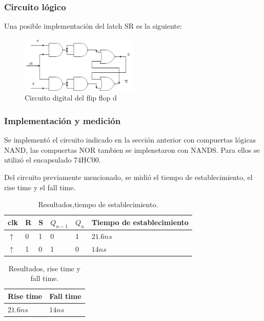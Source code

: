 \documentclass[../../e3_tp2_main.tex]{subfiles}
\begin{document}
\subsubsection{Circuito lógico}
Una posible implementación del latch SR es la siguiente:
\begin{figure}[H]	
	\centering
	\includegraphics[width=0.5\textwidth]{imagenes/lsr_cd.png}
	\caption{Circuito digital del flip flop d}
\end{figure}

\subsubsection{Implementación y medici\'on}
Se implementó el circuito indicado en la sección anterior con compuertas lógicas NAND, las compuertas NOR tambien se implenetaron con NANDS. Para ellos se utilizó el encapsulado 74HC00. \par

Del circuito previamente mencionado, se midió el tiempo de establecimiento, el rise time y el fall time. 

\begin{table}[h]
\begin{center}
\begin{tabular}{|l|l|l|l|l|l|}
\hline
clk& R&S & $Q_{n-1}$ & $Q_n$ &Tiempo de establecimiento\\
\hline \hline
$\uparrow$ &0 & 1 &0&1&$21.6 n s$  \\ \hline
$\uparrow$ &1 & 0 &1&0&$14 n s$  \\ \hline

\end{tabular}
\caption{Resultados,tiempo de establecimiento.} 
\end{center}
\end{table}

\begin{table}[h]
\begin{center}
\begin{tabular}{|l|l|}
\hline
Rise time& Fall time \\
\hline \hline
$21.6 n s$  & $14 n s$ \\ \hline
\end{tabular}
\caption{Resultados, rise time y fall time.} 
\end{center}
\end{table}
\end{document}

